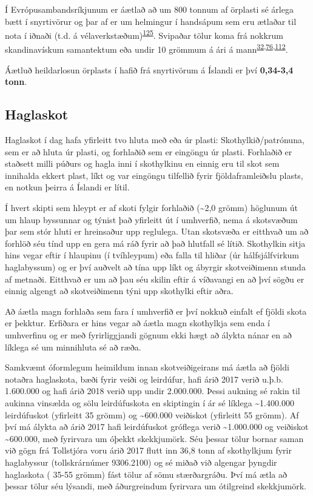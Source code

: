 \documentclass[icelandic,]{book}
\begin{document}
Í Evrópusambandsríkjunum er áætlað að um 800 tonnum af örplasti sé árlega bætt í snyrtivörur og þar af er um helmingur í handsápum sem eru ætlaðar til nota í iðnaði (t.d. á vélaverkstæðum)\textsuperscript{\protect\hyperlink{ref-Scudo2017}{125}}. Svipaðar tölur koma frá nokkrum skandinavískum samantektum eða undir 10 grömmum á ári á mann\textsuperscript{\protect\hyperlink{ref-sundt2014sources}{32},\protect\hyperlink{ref-lassen2015microplastics}{76},\protect\hyperlink{ref-magnusson2016swedish}{112}}.

Áætluð heildarlosun örplasts í hafið frá snyrtivörum á Íslandi er því \textbf{0,34-3,4 tonn}.

\hypertarget{haglaskot}{%
\subsection*{Haglaskot}\label{haglaskot}}

Haglaskot í dag hafa yfirleitt tvo hluta með eða úr plasti: Skothylkið/patrónuna, sem er að hluta úr plasti, og forhlaðið sem er eingöngu úr plasti. Forhlaðið er staðsett milli púðurs og hagla inni í skothylkinu en einnig eru til skot sem innihalda ekkert plast, líkt og var eingöngu tilfellið fyrir fjöldaframleiðslu plasts, en notkun þeirra á Íslandi er lítil.

Í hvert skipti sem hleypt er af skoti fylgir forhlaðið (\textasciitilde{}2,0 grömm) höglunum út um hlaup byssunnar og týnist það yfirleitt út í umhverfið, nema á skotsvæðum þar sem stór hluti er hreinsaður upp reglulega. Utan skotsvæða er eitthvað um að forhlöð séu tínd upp en gera má ráð fyrir að það hlutfall sé lítið. Skothylkin sitja hins vegar eftir í hlaupinu (í tvíhleypum) eða falla til hliðar (úr hálfsjálfvirkum haglabyssum) og er því auðvelt að tína upp líkt og ábyrgir skotveiðimenn stunda af metnaði. Eitthvað er um að þau séu skilin eftir á víðavangi en að því sögðu er einnig algengt að skotveiðimenn týni upp skothylki eftir aðra.

Að áætla magn forhlaða sem fara í umhverfið er því nokkuð einfalt ef fjöldi skota er þekktur. Erfiðara er hins vegar að áætla magn skothylkja sem enda í umhverfinu og er með fyrirliggjandi gögnum ekki hægt að álykta nánar en að líklega sé um minnihluta sé að ræða.

Samkvæmt óformlegum heimildum innan skotveiðigeirans má áætla að fjöldi notaðra haglaskota, bæði fyrir veiði og leirdúfur, hafi árið 2017 verið u.þ.b. 1.600.000 og hafi árið 2018 verið upp undir 2.000.000. Þessi aukning sé rakin til aukinna vinsælda og sölu leirdúfuskota en skiptingin í ár sé líklega \textasciitilde{}1.400.000 leirdúfuskot (yfirleitt 35 grömm) og \textasciitilde{}600.000 veiðiskot (yfirleitt 55 grömm). Af því má álykta að árið 2017 hafi leirdúfuskot gróflega verið \textasciitilde{}1.000.000 og veiðiskot \textasciitilde{}600.000, með fyrirvara um óþekkt skekkjumörk. Séu þessar tölur bornar saman við gögn frá Tollstjóra voru árið 2017 flutt inn 36,8 tonn af skothylkjum fyrir haglabyssur (tollskrárnúmer 9306.2100) og sé miðað við algengar þyngdir haglaskota ( 35-55 grömm) fást tölur af sömu stærðargráðu. Því má ætla að þessar tölur séu lýsandi, með áðurgreindum fyrirvara um ótilgreind skekkjumörk.
\end{document}
